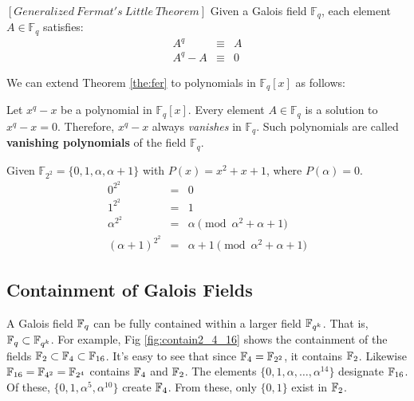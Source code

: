 \begin{Theorem}\label{the:fer}
 $\left[Generalized\  Fermat's\  Little\  Theorem \right]$ Given a
 Galois field $\mathbb{F}_{q}$, each element $A \in \mathbb{F}_{q}$ satisfies: 
\begin{eqnarray}\label{fe}
 A^{q} & \equiv & A  \nonumber \\
 A^{q} - A & \equiv& 0  
\end{eqnarray}
\end{Theorem} 

We can extend Theorem \ref{the:fer} to polynomials in $\mathbb{F}_{q}[x]$ as 
follows: 
\begin{Definition}
Let $x^q-x$ be a polynomial in $\mathbb{F}_{q}[x]$.
Every element $A \in \mathbb{F}_{q}$ is a solution to  $x^q-x=0$. 
Therefore, $x^{q} - x$ always {\it vanishes} in $\mathbb{F}_{q}$. Such 
polynomials are called {\bf vanishing polynomials} of the field $\mathbb{F}_{q}$.
\end{Definition}

\begin{Example}
Given $\mathbb{F}_{2^2} =\{0,1,\alpha,\alpha+1\}$ with $P(x)=x^2+x+1$, where $P(\alpha)=0$. 
 \begin{eqnarray}
 0^{2^2}&=&0 \nonumber \\
 1^{2^2}&=&1 \nonumber \\
 \alpha^{2^2}&=&\alpha \pmod {\alpha^2+\alpha+1}\nonumber \\
 (\alpha+1)^{2^2}&=&\alpha+1 \pmod {\alpha^2+\alpha+1} \nonumber 
 \end{eqnarray}
\end{Example}

\subsection{Containment of Galois Fields}
A Galois field ${\mathbb{F}}_q$ can be fully contained within a larger field ${\mathbb{F}}_{q^k}$.
That is, ${\mathbb{F}}_q \subset {\mathbb{F}}_{q^k}$.
For example, Fig \ref{fig:contain2_4_16} shows the containment of the fields 
${\mathbb{F}}_2 \subset {\mathbb{F}}_4 \subset {\mathbb{F}}_{16}$. It's easy to see that since ${\mathbb{F}}_4={\mathbb{F}}_{2^2}$, it
contains ${\mathbb{F}}_2$. Likewise ${\mathbb{F}}_{16}={\mathbb{F}}_{4^2}={\mathbb{F}}_{2^4}$ contains ${\mathbb{F}}_4$ and ${\mathbb{F}}_2$.
The elements $\{0,1,\alpha,\dots,\alpha^{14}\}$
designate ${\mathbb{F}}_{16}$. Of these, $\{0,1,\alpha^5,\alpha^{10}\}$ create ${\mathbb{F}}_4$.
From these, only $\{0,1\}$ exist in ${\mathbb{F}}_2$.

